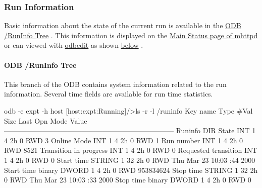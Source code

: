 \par
 

 \par
 \label{RC_Run_States_and_Transitions_idx_ODB_tree_RunInfo}
\hypertarget{RC_Run_States_and_Transitions_idx_ODB_tree_RunInfo}{}
 \hypertarget{RC_Run_States_and_Transitions_RC_ODB_RunInfo}{}\subsubsection{Run Information}\label{RC_Run_States_and_Transitions_RC_ODB_RunInfo}
Basic information about the state of the current run is available in the \hyperlink{RC_Run_States_and_Transitions_RC_ODB_RunInfo_Tree}{ODB /RunInfo Tree} . This information is displayed on the \hyperlink{RC_mhttpd_utility_RC_mhttpd_minimal_status_page}{Main Status page of mhttpd} or can viewed with \hyperlink{RC_odbedit_utility}{odbedit} as shown \hyperlink{RC_Run_States_and_Transitions_RC_ODB_RunInfo_Tree}{below} .\hypertarget{RC_Run_States_and_Transitions_RC_ODB_RunInfo_Tree}{}\paragraph{ODB /RunInfo Tree}\label{RC_Run_States_and_Transitions_RC_ODB_RunInfo_Tree}
This branch of the ODB contains system information related to the run information. Several time fields are available for run time statistics. 
\begin{DoxyCode}
odb -e expt -h host
[host:expt:Running]/>ls -r -l /runinfo
Key name                      Type    #Val  Size  Last Opn Mode Value
------------------------------------------------------------------------
Runinfo                        DIR
    State                      INT     1     4     2h   0   RWD  3
    Online Mode                INT     1     4     2h   0   RWD  1
    Run number                 INT     1     4     2h   0   RWD  8521
    Transition in progress     INT     1     4     2h   0   RWD  0
    Requested transition       INT     1     4     2h   0   RWD  0
    Start time                 STRING  1     32    2h   0   RWD  Thu Mar 23 10:03
      :44 2000
    Start time binary          DWORD   1     4     2h   0   RWD  953834624
    Stop time                  STRING  1     32    2h   0   RWD  Thu Mar 23 10:03
      :33 2000
    Stop time binary           DWORD   1     4     2h   0   RWD  0
\end{DoxyCode}


